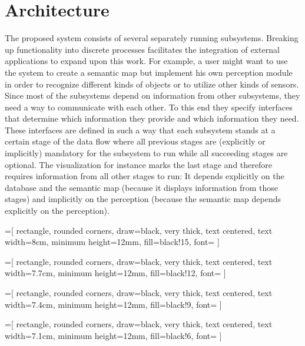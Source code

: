 \chapter{Architecture}
\label{chap:arch}

The proposed system consists of several separately running subsystems. Breaking up functionality into discrete processes facilitates the integration of external applications to expand upon this work. For example, a user might want to use the system to create a semantic map but implement his own perception module in order to recognize different kinds of objects or to utilize other kinds of sensors. \\

Since most of the subsystems depend on information from other subsystems, they need a way to communicate with each other. To this end they specify interfaces that determine which information they provide and which information they need. These interfaces are defined in such a way that each subsystem stands at a certain stage of the data flow where all previous stages are (explicitly or implicitly) mandatory for the subsystem to run while all succeeding stages are optional. The visualization for instance marks the last stage and therefore requires information from all other stages to run: It depends explicitly on the database and the semantic map (because it displays information from those stages) and implicitly on the perception (because the semantic map depends explicitly on the perception).

=[
  rectangle,
  rounded corners,
  draw=black,
  very thick,
  text centered,
  text width=8cm,
  minimum height=12mm,
  fill=black!15,
  font=\sffamily
]

=[
  rectangle,
  rounded corners,
  draw=black,
  very thick,
  text centered,
  text width=7.7cm,
  minimum height=12mm,
  fill=black!12,
  font=\sffamily
]

=[
  rectangle,
  rounded corners,
  draw=black,
  very thick,
  text centered,
  text width=7.4cm,
  minimum height=12mm,
  fill=black!9,
  font=\sffamily
]

=[
  rectangle,
  rounded corners,
  draw=black,
  very thick,
  text centered,
  text width=7.1cm,
  minimum height=12mm,
  fill=black!6,
  font=\sffamily
]

